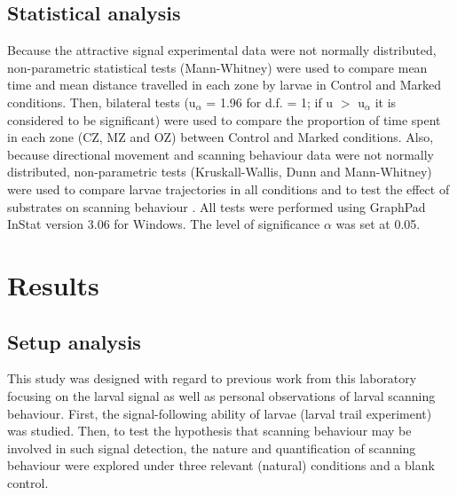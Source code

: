 			\subsection{Statistical analysis}
Because the attractive signal experimental data were not normally distributed, non-parametric statistical tests (Mann-Whitney) were used to compare mean time and mean distance travelled in each zone by larvae in Control and Marked conditions. Then, bilateral tests (u$_{\alpha}$ = 1.96 for d.f. = 1; if u $>$ u$_{\alpha}$ it is considered to be significant) were used to compare the proportion of time spent in each zone (CZ, MZ and OZ) between Control and Marked conditions.
Also, because directional movement and scanning behaviour data were not normally distributed, non-parametric tests (Kruskall-Wallis, Dunn and Mann-Whitney) were used to compare larvae trajectories in all conditions and to test the effect of substrates on scanning behaviour \cite{zar_biostatistical_2010}. All tests were performed using GraphPad InStat version 3.06 for Windows. The level of significance $\alpha$ was set at 0.05.
            
	\section{Results}   
    
			\subsection{Setup analysis}    
This study was designed with regard to previous work from this laboratory focusing on the larval signal \cite{boulay_evidence_2013} as well as personal observations of larval scanning behaviour. First, the signal-following ability of larvae (larval trail experiment) was studied. Then, to test the hypothesis that scanning behaviour may be involved in such signal detection, the nature and quantification of scanning behaviour were explored under three relevant (natural) conditions and a blank control.

